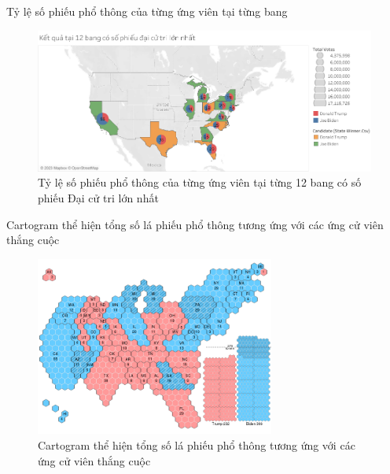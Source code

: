 \documentclass[10pt]{beamer}
\theoremstyle{remark}
\theoremstyle{definition}
\begin{document}
\begin{frame}{Tỷ lệ số phiếu phổ thông của từng ứng viên tại từng bang}
	\begin{figure}[h!]
        \centering
        \includegraphics[width=\textwidth]{figures/12_Electoral_Vote_State_Candidate_Win.png}
        \caption{Tỷ lệ số phiếu phổ thông của từng ứng viên tại từng 12 bang có số phiếu Đại cử tri lớn nhất}
    \end{figure}
\end{frame}

\begin{frame}{Cartogram thể hiện tổng số lá phiếu phổ thông tương ứng với các ứng cử viên thắng cuộc}
	\begin{figure}[h!]
        \centering
        \includegraphics[width=0.7\textwidth]{State_Total_Vote_Cartogram.png}
        \caption{Cartogram thể hiện tổng số lá phiếu phổ thông tương ứng với các ứng cử viên thắng cuộc}
    \end{figure}
\end{frame}
\end{document}
